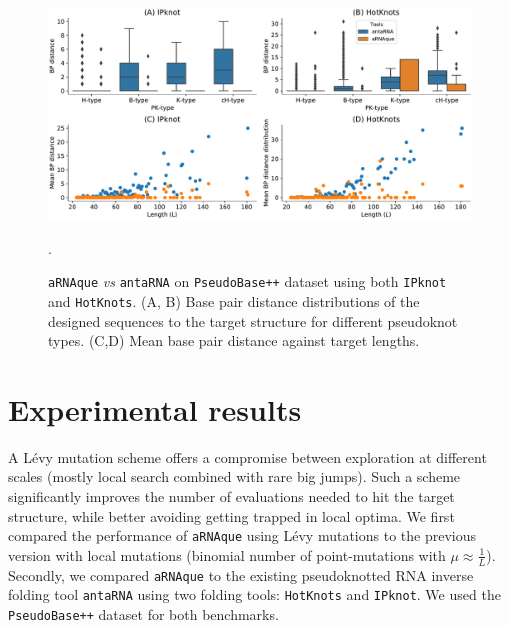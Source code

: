 \begin{figure}[t!]
	\centering
	\includegraphics[width=1.0\linewidth]{../res/images/arnaque/pk_hotknot_IPknot_aRNAqueVSantaRNA_2.pdf}
	\caption{\texttt{aRNAque} \emph{vs} \texttt{antaRNA} on \texttt{PseudoBase++} dataset using both  \texttt{IPknot} and \texttt{HotKnots}. (A, B) Base pair distance distributions of the designed sequences to the target structure for different pseudoknot types. (C,D) Mean base pair distance against target lengths. }\label{Fig:antaRNA_vs_aRNAque}
	\medskip
	\small.
\end{figure}

\section{Experimental results}
A Lévy mutation scheme offers a compromise between exploration at different scales (mostly local search combined with rare big jumps). Such a scheme significantly improves the number of evaluations needed to hit the target structure, while better avoiding getting trapped in local optima. We first compared the performance of \texttt{aRNAque} using Lévy mutations to the previous version with local mutations (binomial number of point-mutations with $\mu \approx \frac{1}{L}$). Secondly, we compared \texttt{aRNAque} to the existing pseudoknotted RNA inverse folding tool \texttt{antaRNA} using two folding tools: \texttt{HotKnots} and \texttt{IPknot}. We used the \texttt{PseudoBase++} dataset for both benchmarks. 


